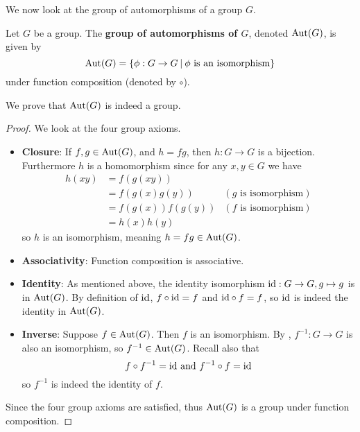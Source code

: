 We now look at the group of automorphisms of a group $G$.
\begin{definition}
    Let $G$ be a group. The \textbf{group of automorphisms of $G$}, denoted $\mathrm{Aut}(G)$, is given by
    \[
        \Aut{G} = \{\phi: G \to G \vert \phi \text{ is an isomorphism}\}
    \]
    under function composition (denoted by $\circ$).
\end{definition}
We prove that $\mathrm{Aut}(G)$ is indeed a group.

\begin{proof}
    We look at the four group axioms.
    \begin{itemize}
        \item \textbf{Closure}: If $f, g \in \mathrm{Aut}(G)$, and $h = fg$, then $h: G \to G$ is a bijection. Furthermore $h$ is a homomorphism since for any $x, y \in G$ we have
        \begin{align*}
            h(xy) &= f(g(xy))\\
            &= f(g(x)g(y)) & (g \text{ is isomorphism})\\
            &= f(g(x))f(g(y)) & (f \text{ is isomorphism})\\
            &= h(x)h(y)
        \end{align*}
        so $h$ is an isomorphism, meaning $h = fg \in \mathrm{Aut}(G)$.

        \item \textbf{Associativity}: Function composition is associative.

        \item \textbf{Identity}: As mentioned above, the identity isomorphism $\mathrm{id}: G \to G, g \mapsto g$ is in $\mathrm{Aut}(G)$. By definition of $\mathrm{id}$, $f \circ \mathrm{id} = f$ and $\mathrm{id} \circ f = f$, so $\mathrm{id}$ is indeed the identity in $\mathrm{Aut}(G)$.

        \item \textbf{Inverse}: Suppose $f \in \mathrm{Aut}(G)$. Then $f$ is an isomorphism. By , $f^{-1}: G \to G$ is also an isomorphism, so $f^{-1} \in \mathrm{Aut}(G)$. Recall also that
        \[
            f\circ f^{-1} = \mathrm{id} \text{ and } f^{-1}\circ f = \mathrm{id}
        \]
        so $f^{-1}$ is indeed the identity of $f$.
    \end{itemize}
    Since the four group axioms are satisfied, thus $\mathrm{Aut}(G)$ is a group under function composition.
\end{proof}

